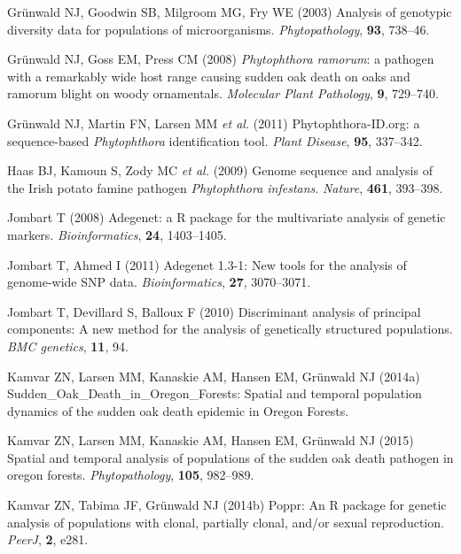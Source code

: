 \documentclass[double,12pt]{beavtex}
\begin{document}
  \hypertarget{ref-grunwald2003analysis}{}
  Grünwald NJ, Goodwin SB, Milgroom MG, Fry WE (2003) Analysis of
  genotypic diversity data for populations of microorganisms.
  \emph{Phytopathology}, \textbf{93}, 738--46.
  
  \hypertarget{ref-grunwald2008phytophthora}{}
  Grünwald NJ, Goss EM, Press CM (2008) \emph{Phytophthora ramorum}: a
  pathogen with a remarkably wide host range causing sudden oak death on
  oaks and ramorum blight on woody ornamentals. \emph{Molecular Plant
  Pathology}, \textbf{9}, 729--740.
  
  \hypertarget{ref-grunwald2011phytophthora}{}
  Grünwald NJ, Martin FN, Larsen MM \emph{et al.} (2011)
  Phytophthora-ID.org: a sequence-based \emph{Phytophthora} identification
  tool. \emph{Plant Disease}, \textbf{95}, 337--342.
  
  \hypertarget{ref-haas2009genome}{}
  Haas BJ, Kamoun S, Zody MC \emph{et al.} (2009) Genome sequence and
  analysis of the Irish potato famine pathogen \emph{Phytophthora
  infestans}. \emph{Nature}, \textbf{461}, 393--398.
  
  \hypertarget{ref-Jombartux5f2008}{}
  Jombart T (2008) Adegenet: a R package for the multivariate analysis of
  genetic markers. \emph{Bioinformatics}, \textbf{24}, 1403--1405.
  
  \hypertarget{ref-jombart2011adegenet}{}
  Jombart T, Ahmed I (2011) Adegenet 1.3-1: New tools for the analysis of
  genome-wide SNP data. \emph{Bioinformatics}, \textbf{27}, 3070--3071.
  
  \hypertarget{ref-jombart2010discriminant}{}
  Jombart T, Devillard S, Balloux F (2010) Discriminant analysis of
  principal components: A new method for the analysis of genetically
  structured populations. \emph{BMC genetics}, \textbf{11}, 94.
  
  \hypertarget{ref-kamvar2014sudden}{}
  Kamvar ZN, Larsen MM, Kanaskie AM, Hansen EM, Grünwald NJ (2014a)
  Sudden\_Oak\_Death\_in\_Oregon\_Forests: Spatial and temporal population
  dynamics of the sudden oak death epidemic in Oregon Forests.
  
  \hypertarget{ref-kamvar2015spatial}{}
  Kamvar ZN, Larsen MM, Kanaskie AM, Hansen EM, Grünwald NJ (2015) Spatial
  and temporal analysis of populations of the sudden oak death pathogen in
  oregon forests. \emph{Phytopathology}, \textbf{105}, 982--989.
  
  \hypertarget{ref-kamvar2014poppr}{}
  Kamvar ZN, Tabima JF, Grünwald NJ (2014b) Poppr: An R package for
  genetic analysis of populations with clonal, partially clonal, and/or
  sexual reproduction. \emph{PeerJ}, \textbf{2}, e281.
  
\end{document}
